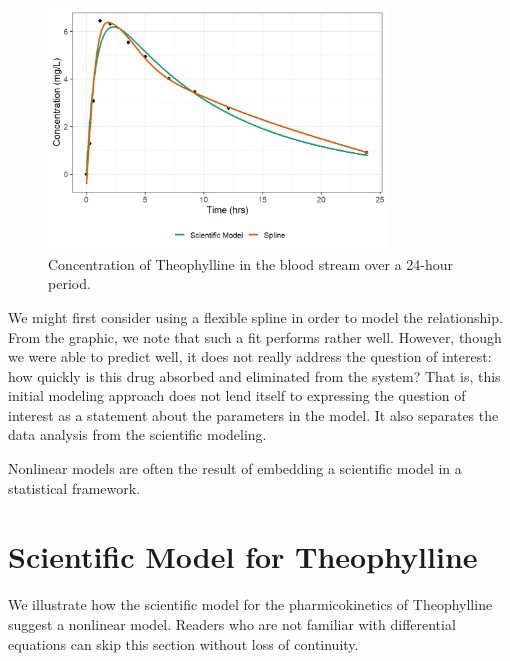 \documentclass[
]{book}
\theoremstyle{plain}
\theoremstyle{mydefn}
\theoremstyle{myexmpl}
\theoremstyle{remark}
\begin{document}
\begin{figure}

{\centering \includegraphics[width=0.8\textwidth]{./Images/nlm-theoph-plot-1} 

}

\caption{Concentration of Theophylline in the blood stream over a 24-hour period.}\label{fig:nlm-theoph-plot}
\end{figure}

We might first consider using a flexible spline in order to model the relationship. From the graphic, we note that such a fit performs rather well. However, though we were able to predict well, it does not really address the question of interest: how quickly is this drug absorbed and eliminated from the system? That is, this initial modeling approach does not lend itself to expressing the question of interest as a statement about the parameters in the model. It also separates the data analysis from the scientific modeling.

\begin{rmdkeyidea}
Nonlinear models are often the result of embedding a scientific model in a statistical framework.
\end{rmdkeyidea}

\hypertarget{scientific-model-for-theophylline}{%
\section{Scientific Model for Theophylline}\label{scientific-model-for-theophylline}}

We illustrate how the scientific model for the pharmicokinetics of Theophylline suggest a nonlinear model. Readers who are not familiar with differential equations can skip this section without loss of continuity.
\end{document}
